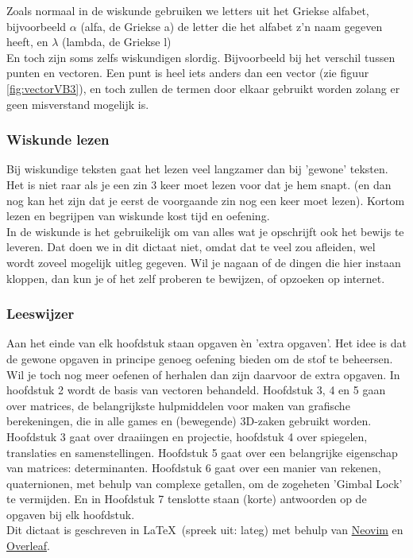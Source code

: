 Zoals normaal in de wiskunde gebruiken we letters uit het Griekse alfabet, bijvoorbeeld $ \alpha $ (alfa, de Griekse a) de letter die het alfabet z'n naam gegeven heeft, en  $ \lambda $ (lambda, de Griekse l)\\
En toch zijn soms zelfs wiskundigen slordig. Bijvoorbeeld bij het verschil tussen punten en vectoren. Een punt is heel iets anders dan een vector  (zie figuur \ref{fig:vectorVB3}), en toch zullen de termen door elkaar gebruikt worden zolang er geen misverstand mogelijk is.

\subsubsection{Wiskunde lezen}
Bij wiskundige teksten gaat het lezen veel langzamer  dan bij 'gewone' teksten. Het is niet raar als je een zin 3 keer moet lezen voor dat je hem snapt. (en dan nog kan het zijn dat je eerst de voorgaande zin nog een keer moet lezen). Kortom lezen en begrijpen van wiskunde kost tijd en oefening. \\

In de wiskunde is het gebruikelijk om van alles wat je opschrijft ook het bewijs te leveren. Dat doen we in dit dictaat niet, omdat dat te veel zou afleiden, wel wordt zoveel mogelijk uitleg gegeven. Wil je nagaan of de dingen die hier instaan kloppen, dan kun je of het zelf proberen te bewijzen, of opzoeken op internet.

\subsubsection{Leeswijzer}
Aan het einde van elk hoofdstuk staan opgaven èn 'extra opgaven'. Het idee is dat de gewone opgaven in principe genoeg oefening bieden om de stof te beheersen. Wil je toch nog meer oefenen of herhalen dan zijn daarvoor de extra opgaven. In hoofdstuk 2 wordt de basis van vectoren behandeld. Hoofdstuk 3, 4 en 5 gaan over matrices, de belangrijkste hulpmiddelen voor maken van grafische berekeningen, die in alle games en (bewegende) 3D-zaken gebruikt worden. Hoofdstuk 3 gaat over draaiingen en projectie, hoofdstuk 4 over spiegelen, translaties en samenstellingen. Hoofdstuk 5 gaat over een belangrijke eigenschap van matrices: determinanten. Hoofdstuk 6 gaat over een manier van rekenen, quaternionen, met behulp van complexe getallen, om de zogeheten 'Gimbal Lock' te vermijden. En in Hoofdstuk 7 tenslotte staan (korte) antwoorden op de opgaven bij elk hoofdstuk. \\

Dit dictaat is geschreven in \LaTeX\ (spreek uit: lateg) met behulp van \href{https://neovim.io/}{Neovim} en \href{https://www.overleaf.com}{Overleaf}. 

